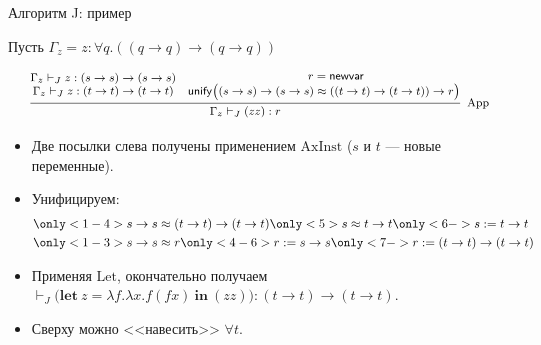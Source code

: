 \documentclass[xcolor=dvipsnames]{beamer}
\newcommand{\letin}[2]{\mathbf{let}\ {#1}\ \mathbf{in}\ {#2}}
\begin{document}
\begin{frame}{Алгоритм J: пример}

Пусть $\Gamma_z = z : \forall q. ((q \to q) \to (q \to q))$

\[\footnotesize
 \infer[\mathrm{App}]
 {\Gamma_z \vdash_J (zz) : r}
 {\begin{matrix}\Gamma_z \vdash_J z : (s \to s) \to (s \to s) \\ \Gamma_z \vdash_J z : (t \to t) \to (t \to t) \end{matrix} & 
 \begin{matrix} \qquad r = \mathsf{newvar} \\ \mathsf{unify}\bigl((s \to s) \to (s \to s) \approx ((t \to t) \to (t \to t)) \to r\bigr)\end{matrix}}
\]

{\small
\begin{itemize}
 \item<2-> Две посылки слева получены применением $\mathrm{AxInst}$ ($s$ и $t$ --- новые переменные).
 \item<3-> Унифицируем:
 \begin{align*}
  & \only<1-4>{s \to s \approx (t \to t) \to (t \to t)} 
  \only<5>{s \approx t \to t}
  \only<6->{s := t \to t}\\
  & \only<1-3>{s \to s \approx r}
  \only<4-6>{r := s \to s}
  \only<7->{r := (t \to t) \to (t \to t)}
 \end{align*}

 \item<8-> Применяя $\mathrm{Let}$, окончательно получаем $\vdash_J \bigl(\letin{z = \lambda f. \lambda x. f(f x)}{(zz)} \bigr) : (t \to t) \to (t \to t)$.
 \item<9-> Сверху можно <<навесить>> $\forall t$.
\end{itemize}

}
 
\end{frame}
\end{document}
